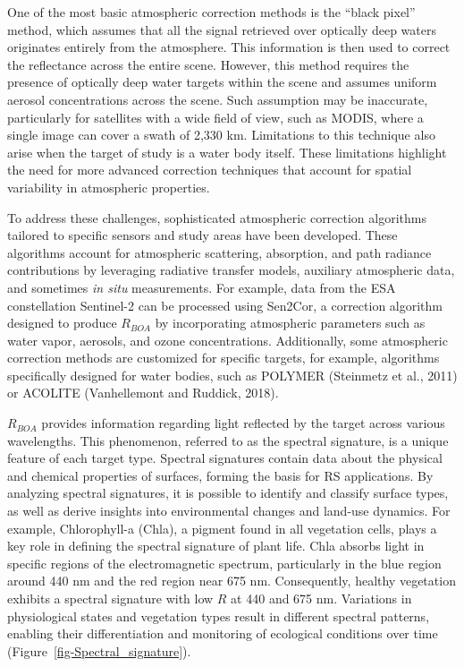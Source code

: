\documentclass[
  letterpaper,
  11pt,
  english,
  singlespacing,
  headsepline]{MastersDoctoralThesis}
\begin{document}
\begin{spacing}{1.5}
One of the most basic atmospheric correction methods is the ``black
pixel'' method, which assumes that all the signal retrieved over
optically deep waters originates entirely from the atmosphere. This
information is then used to correct the reflectance across the entire
scene. However, this method requires the presence of optically deep
water targets within the scene and assumes uniform aerosol
concentrations across the scene. Such assumption may be inaccurate,
particularly for satellites with a wide field of view, such as MODIS,
where a single image can cover a swath of 2,330 km. Limitations to this
technique also arise when the target of study is a water body itself.
These limitations highlight the need for more advanced correction
techniques that account for spatial variability in atmospheric
properties.

To address these challenges, sophisticated atmospheric correction
algorithms tailored to specific sensors and study areas have been
developed. These algorithms account for atmospheric scattering,
absorption, and path radiance contributions by leveraging radiative
transfer models, auxiliary atmospheric data, and sometimes \emph{in
situ} measurements. For example, data from the ESA constellation
Sentinel-2 can be processed using Sen2Cor, a correction algorithm
designed to produce \(R_{BOA}\) by incorporating atmospheric parameters
such as water vapor, aerosols, and ozone concentrations. Additionally,
some atmospheric correction methods are customized for specific targets,
for example, algorithms specifically designed for water bodies, such as
POLYMER (Steinmetz et al., 2011) or ACOLITE (Vanhellemont and Ruddick,
2018).

\(R_{BOA}\) provides information regarding light reflected by the target
across various wavelengths. This phenomenon, referred to as the spectral
signature, is a unique feature of each target type. Spectral signatures
contain data about the physical and chemical properties of surfaces,
forming the basis for RS applications. By analyzing spectral signatures,
it is possible to identify and classify surface types, as well as derive
insights into environmental changes and land-use dynamics. For example,
Chlorophyll-a (Chla), a pigment found in all vegetation cells, plays a
key role in defining the spectral signature of plant life. Chla absorbs
light in specific regions of the electromagnetic spectrum, particularly
in the blue region around 440 nm and the red region near 675 nm.
Consequently, healthy vegetation exhibits a spectral signature with low
\(R\) at 440 and 675 nm. Variations in physiological states and
vegetation types result in different spectral patterns, enabling their
differentiation and monitoring of ecological conditions over time
(Figure~\ref{fig-Spectral_signature}).


\end{spacing}
\end{document}
